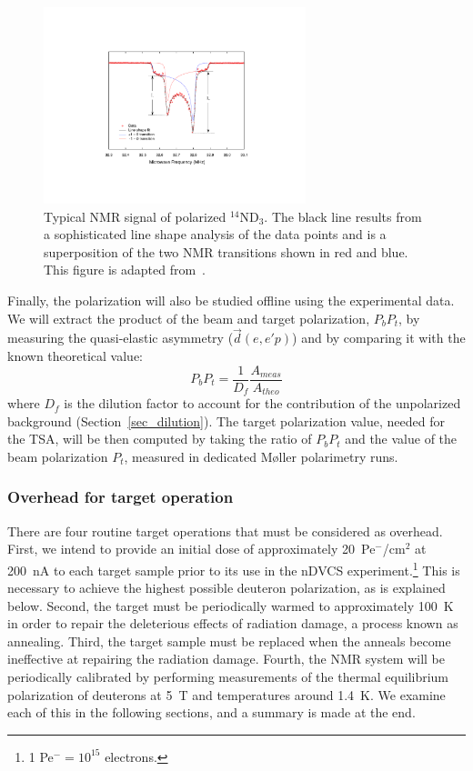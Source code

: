 \begin{figure}
\begin{center}
\includegraphics[width=3in]{Stache_NMR.pdf}
\end{center}
\caption[Typical ${}^{14}$ND$_3$ NMR signal]
{Typical NMR signal of polarized ${}^{14}$ND$_3$.  The black line results from a sophisticated line shape 
analysis of the data points and is a superposition of the two NMR transitions shown in red and blue.
This figure is adapted from~\cite{Kwaltine2013}.}
\label{NMR}
\end{figure}

Finally, the polarization will also be studied offline using the experimental data. We will extract the product of the beam and target polarization, $P_b P_t$, by measuring the quasi-elastic asymmetry ($\vec{d}(e,e'p)$) and by comparing it with the known theoretical value:
\begin{equation}
  P_b P_t=\frac{1}{D_f}\frac{A_{meas}}{A_{theo}}
\end{equation}
where $D_f$ is the dilution factor to account for the contribution of the unpolarized background (Section~\ref{sec_dilution}).
The target polarization value, needed for the TSA, will be then computed by taking the ratio of $P_bP_t$ and  the value of the beam polarization $P_t$, measured in dedicated M{\o}ller polarimetry runs. 

\subsubsection{Overhead for target operation}\label{sec_target_over}
There are four routine target operations that must be considered as overhead. 
First, we intend to provide an initial dose of approximately 20~Pe$^{\minus}$/cm$^2$ at 200~nA to each target sample prior to its use in the nDVCS experiment.\footnote{1 Pe$^{\minus} = 10^{15}$ electrons.}  This is necessary to achieve the highest possible deuteron polarization, as is explained below.  Second, the target must be periodically warmed to approximately 100~K in order to repair the deleterious effects of radiation damage, a process known as annealing.  Third, the target sample must be replaced when the anneals become ineffective at repairing the radiation damage.  Fourth, the NMR system will be periodically calibrated by performing
measurements of the thermal equilibrium polarization of deuterons at 5~T and temperatures around 1.4~K.
We examine each of this in the following sections, and a summary is made at the end.

